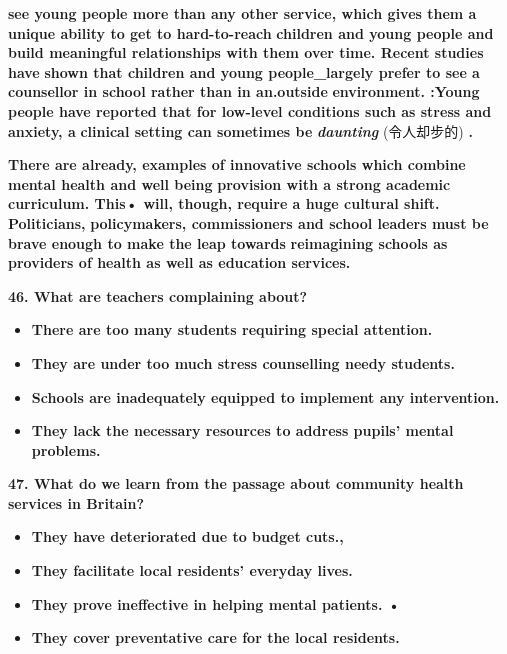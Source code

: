 \documentclass[UTF8,11pt]{ctexart}
\begin{document}
\textbf{see young people more than any other service, which gives them a unique ability to get to hard-to-reach} \textbf{children and young people and build meaningful relationships with them over time. Recent studies have} \textbf{shown that children and young people\_largely prefer to see a counsellor in school rather than in an.outside} \textbf{environment. :Young people have reported that for low-level conditions such as stress and anxiety, a} \textbf{clinical setting can sometimes be }\textbf{\textit{daunting }}(令人却步的)\textbf{ .}


\textbf{There are already, examples of innovative schools which combine mental health and well being} \textbf{provision with a strong academic curriculum. This• will, though, require a huge cultural shift. Politicians,} \textbf{policymakers, commissioners and school leaders must be brave enough to make the leap towards} \textbf{reimagining schools as providers of health as well as education services.}


\textbf{46. What are teachers complaining about?}


\begin{itemize}[leftmargin=2em,itemsep=.2em,topsep=.4em]\item[A.] \textbf{There are too many students requiring special attention.}
\item[B.] \textbf{They are under too much stress counselling \textperiodcentered{}needy students.}
\item[C.] \textbf{Schools are inadequately equipped to implement any intervention.}
\item[D.] \textbf{They lack the necessary resources to address pupils' mental problems.}
\end{itemize}

\textbf{47. What do we learn from the passage about community health services in Britain?}


\begin{itemize}[leftmargin=2em,itemsep=.2em,topsep=.4em]\item[A.] \textbf{They have deteriorated due to budget cuts.,\textperiodcentered{}}
\item[B.] \textbf{They facilitate local residents' everyday lives.}
\item[C.] \textbf{They prove ineffective in helping mental patients. •}
\item[D.] \textbf{They cover preventative care for the local residents.}
\end{itemize}
\end{document}
